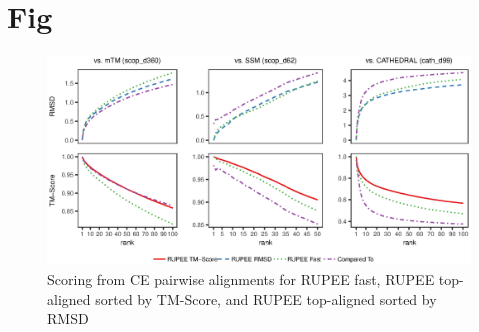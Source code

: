 \documentclass[letter]{article}
\begin{document}
\section{Fig}

\begin{figure}[!h]
\begin{center}
    \includegraphics[width=6in, keepaspectratio]{S2Fig1}
\end{center}
\caption{Scoring from CE pairwise alignments for RUPEE fast, RUPEE top-aligned sorted by TM-Score, and RUPEE top-aligned sorted by RMSD}
\label{fig:combined_scoring_ce}
\end{figure}
\end{document}
